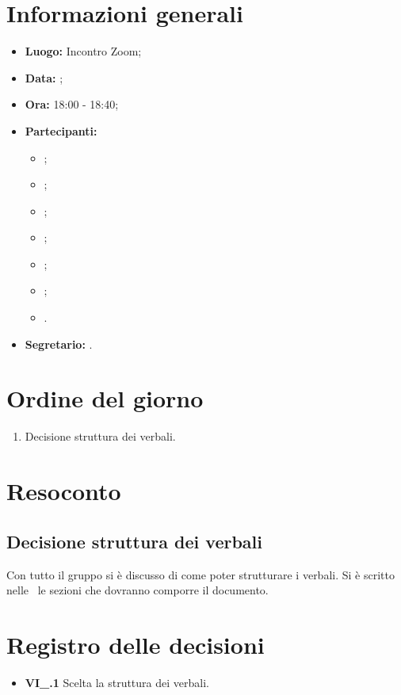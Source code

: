 \section{Informazioni generali}
\begin{itemize}
\item \textbf{Luogo:} Incontro Zoom;
\item \textbf{Data:} \Data;
\item \textbf{Ora:} 18:00 - 18:40;
\item \textbf{Partecipanti:}
	\begin{itemize}
		\item \BL{}; 
		\item \FF{};
		\item \MM{}; 
		\item \PC{};
		\item \TG{};
		\item \TL{};
		\item \VD{}.
	\end{itemize} 
\item \textbf{Segretario:} \PC{}.
\end{itemize}

\section{Ordine del giorno}
\begin{enumerate}
 \item Decisione struttura dei verbali.
\end{enumerate}

\section{Resoconto}
\subsection{Decisione struttura dei verbali}
Con tutto il gruppo si è discusso di come poter strutturare i verbali. Si è scritto nelle \NdP\ le sezioni che dovranno comporre il documento.

\section{Registro delle decisioni}
\begin{itemize}
  \item \textbf{VI\_\Data.1} Scelta la struttura dei verbali.
\end{itemize}